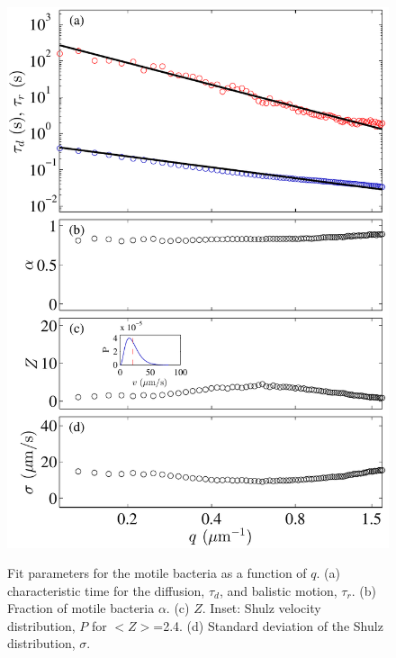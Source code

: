 \documentclass[%
 aip,
 jmp,%
 amsmath,amssymb,
reprint,%
]{revtex4-1}
\begin{document}
\begin{figure}
	\includegraphics[width=\linewidth]{VitesseDiffusionParams.pdf}\\
	\caption{Fit parameters for the motile bacteria as a function of $q$. (a) characteristic time for the diffusion, $\tau_d$, and balistic motion, $\tau_r$. (b) Fraction of motile bacteria $\alpha$. (c) $Z$. Inset: Shulz velocity distribution, $P$ for $<Z>$=2.4. (d) Standard deviation of the Shulz distribution, $\sigma$.}
	\label{FitParametersBacteria}
\end{figure}
\end{document}
